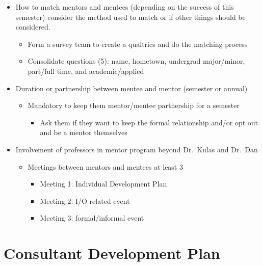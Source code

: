 \documentclass[
]{book}
\providecommand{\tightlist}{%
  \setlength{\itemsep}{0pt}\setlength{\parskip}{0pt}}
\begin{document}
\begin{itemize}
\tightlist
\item
  How to match mentors and mentees (depending on the success of this semester) consider the method used to match or if other things should be considered.

  \begin{itemize}
  \tightlist
  \item
    Form a survey team to create a qualtrics and do the matching process
  \item
    Consolidate questions (5): name, hometown, undergrad major/minor, part/full time, and academic/applied
  \end{itemize}
\item
  Duration or partnership between mentee and mentor (semester or annual)

  \begin{itemize}
  \tightlist
  \item
    Mandatory to keep them mentor/mentee partnership for a semester

    \begin{itemize}
    \tightlist
    \item
      Ask them if they want to keep the formal relationship and/or opt out and be a mentor themselves
    \end{itemize}
  \end{itemize}
\item
  Involvement of professors in mentor program beyond Dr.~Kulas and Dr.~Dan

  \begin{itemize}
  \tightlist
  \item
    Meetings between mentors and mentees at least 3

    \begin{itemize}
    \tightlist
    \item
      Meeting 1: Individual Development Plan
    \item
      Meeting 2: I/O related event
    \item
      Meeting 3: formal/informal event
    \end{itemize}
  \end{itemize}
\end{itemize}

\hypertarget{consultant-development-plan}{%
\section{Consultant Development Plan}\label{consultant-development-plan}}
\end{document}
